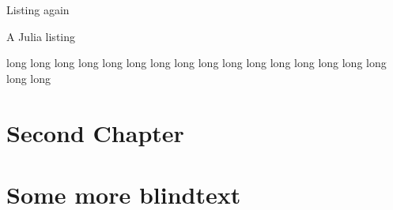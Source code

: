 \documentclass[
    fontsize=10pt,
    twoside=true,
    secnumdepth=1,
    numbers=noenddot,
]{kaobook}
\begin{document}

Listing again
\begin{listing}
\caption{A Julia listing}
\begin{juliacode}
long long long long long long long long long long long long long long long long long long
\end{juliacode}
\end{listing}







\chapter{Second Chapter}

\blindtext

\appendix %


\chapter{Some more blindtext}

\blindtext


\backmatter %



\printbibliography[heading=bibintoc, title=Bibliography, prenote=bibnote] %
\end{document}
